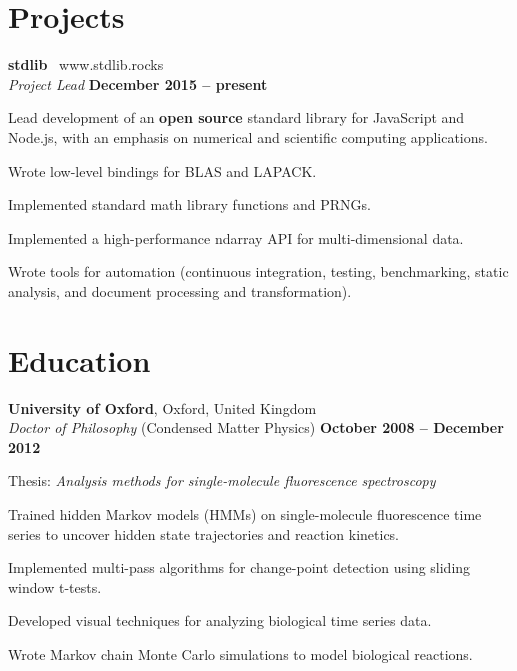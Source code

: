 \documentclass[margin,line]{resume}
\begin{document}
\begin{resume}

	\section{\mysidestyle Projects}

	\textbf{stdlib} \textbar\ www.stdlib.rocks \vspace{1mm}\\
    \textsl{Project Lead} \hfill \textbf{December 2015 -- present} \vspace{1mm}\\
	\vspace{-4mm}
    \begin{list2}
		\item Lead development of an \textbf{open source} standard library for JavaScript and Node.js, with an emphasis on numerical and scientific computing applications.
		\item Wrote low-level bindings for BLAS and LAPACK.
		\item Implemented standard math library functions and PRNGs.
		\item Implemented a high-performance ndarray API for multi-dimensional data.
		\item Wrote tools for automation (continuous integration, testing, benchmarking, static analysis, and document processing and transformation).
	\end{list2}
	\vspace{-1.5mm}


	\section{\mysidestyle Education}

	\textbf{University of Oxford}, Oxford, United Kingdom \vspace{1mm}\\
	\textsl{Doctor of Philosophy} (Condensed Matter Physics) \hfill \textbf{ October 2008 -- December 2012} \vspace{1mm}\\
	\vspace{-4mm}
	\begin{list2}
		\item Thesis: \textit{Analysis methods for single-molecule fluorescence spectroscopy}
		\item Trained hidden Markov models (HMMs) on single-molecule fluorescence time series to uncover hidden state trajectories and reaction kinetics.
		\item Implemented multi-pass algorithms for change-point detection using sliding window t-tests.
		\item Developed visual techniques for analyzing biological time series data.
		\item Wrote Markov chain Monte Carlo simulations to model biological reactions.
	\end{list2}
	\vspace{-1.5mm}


\end{resume}
\end{document}
